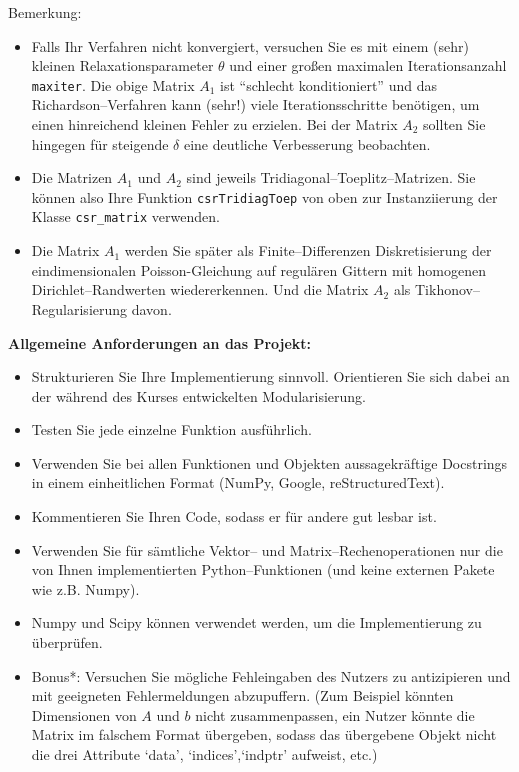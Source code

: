 Bemerkung:\begin{itemize}
	\item  Falls Ihr Verfahren nicht konvergiert, versuchen Sie es mit einem (sehr) kleinen Relaxationsparameter $\theta$ und einer großen maximalen Iterationsanzahl \texttt{maxiter}. Die obige Matrix $A_1$ ist ``schlecht konditioniert'' und das Richardson--Verfahren kann (sehr!) viele Iterationsschritte benötigen, um einen hinreichend kleinen Fehler zu erzielen. Bei der Matrix $A_2$ sollten Sie hingegen für steigende $\delta$ eine deutliche Verbesserung beobachten.
	\item Die Matrizen $A_1$ und $A_2$ sind jeweils Tridiagonal--Toeplitz--Matrizen. Sie können also Ihre Funktion \texttt{csrTridiagToep} von oben zur Instanziierung der Klasse \texttt{csr\_matrix} verwenden.
	\item Die Matrix $A_1$ werden Sie später als Finite--Differenzen Diskretisierung der eindimensionalen Poisson-Gleichung auf regulären Gittern mit homogenen Dirichlet--Randwerten wiedererkennen. Und die Matrix $A_2$ als Tikhonov--Regularisierung davon.
\end{itemize}





\textbf{Allgemeine Anforderungen an das Projekt:}\\

\begin{itemize}
	\item Strukturieren Sie Ihre Implementierung sinnvoll. Orientieren Sie sich dabei an der während des Kurses entwickelten Modularisierung.
	\item Testen Sie jede einzelne Funktion ausführlich.
	\item Verwenden Sie bei allen Funktionen und Objekten aussagekräftige Docstrings in einem einheitlichen Format (NumPy, Google, reStructuredText).
	\item Kommentieren Sie Ihren Code, sodass er für andere gut lesbar ist.
	\item Verwenden Sie für sämtliche Vektor-- und Matrix--Rechenoperationen nur die von Ihnen implementierten Python--Funktionen (und keine externen Pakete wie z.B. Numpy).
	\item Numpy und Scipy können verwendet werden, um die Implementierung zu überprüfen.
	\item Bonus*: Versuchen Sie mögliche Fehleingaben des Nutzers zu antizipieren und mit geeigneten Fehlermeldungen abzupuffern.	(Zum Beispiel könnten Dimensionen von $A$ und $b$ nicht zusammenpassen, ein Nutzer könnte die Matrix im falschem Format übergeben, sodass das übergebene Objekt nicht die drei Attribute `data', `indices',`indptr' aufweist, etc.)
\end{itemize}



